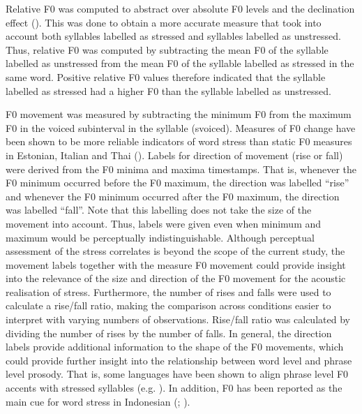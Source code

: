 Relative F0 was computed to abstract over absolute F0 levels and the declination effect (\citealt{breckenridge_declination_1977}). This was done to obtain a more accurate measure that took into account both syllables labelled as stressed and syllables labelled as unstressed. Thus, relative F0 was computed by subtracting the mean F0 of the syllable labelled as unstressed from the mean F0 of the syllable labelled as stressed in the same word. Positive relative F0 values therefore indicated that the syllable labelled as stressed had a higher F0 than the syllable labelled as unstressed.\par

F0 movement was measured by subtracting the minimum F0 from the maximum F0 in the voiced subinterval in the syllable (svoiced). Measures of F0 change have been shown to be more reliable indicators of word stress than static F0 measures in Estonian, Italian and Thai (\citealt{gordon_acoustic_2017}). Labels for direction of movement (rise or fall) were derived from the F0 minima and maxima timestamps. That is, whenever the F0 minimum occurred before the F0 maximum, the direction was labelled ``rise'' and whenever the F0 minimum occurred after the F0 maximum, the direction was labelled ``fall''. Note that this labelling does not take the size of the movement into account. Thus, labels were given even when minimum and maximum would be perceptually indistinguishable. Although perceptual assessment of the stress correlates is beyond the scope of the current study, the movement labels together with the measure F0 movement could provide insight into the relevance of the size and direction of the F0 movement for the acoustic realisation of stress. Furthermore, the number of rises and falls were used to calculate a rise/fall ratio, making the comparison across conditions easier to interpret with varying numbers of observations. Rise/fall ratio was calculated by dividing the number of rises by the number of falls. In general, the direction labels provide additional information to the shape of the F0 movements, which could provide further insight into the relationship between word level and phrase level prosody. That is, some languages have been shown to align phrase level F0 accents with stressed syllables (e.g. \citealt{sluijter_spectral_1996}). In addition, F0 has been reported as the main cue for word stress in Indonesian (\citealt{halim_intonation_1981}; \citealt{laksman_location_1994}).\par

